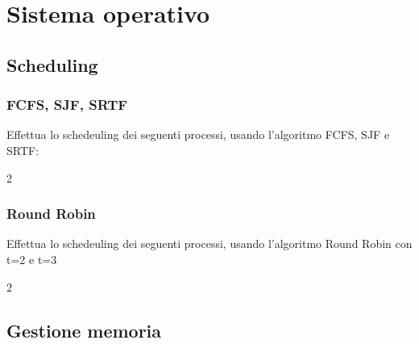\documentclass[11pt,fleqn]{book}
\begin{document}

\part{Sistema operativo}


\chapter{Scheduling}

\section{FCFS, SJF, SRTF}

Effettua lo schedeuling dei seguenti processi, usando l'algoritmo FCFS, SJF e SRTF:

\begin{multicols}{2}
    \immediate{}
    
\end{multicols}

\newpage

\section{Round Robin}

Effettua lo schedeuling dei seguenti processi, usando l'algoritmo Round Robin con t=2 e t=3

\begin{multicols}{2}
    \immediate{}
    
\end{multicols}


\chapter{Gestione memoria}
\end{document}
